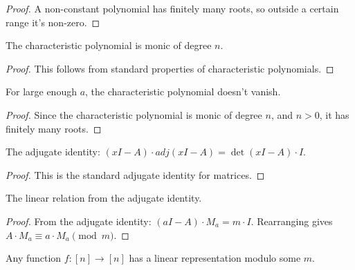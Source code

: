 \begin{proof}
A non-constant polynomial has finitely many roots, so outside a certain range it's non-zero.
\end{proof}

\begin{lemma}
\label{lem:charpoly_monic_degree}
\leanok
The characteristic polynomial is monic of degree $n$.
\end{lemma}

\begin{proof}
This follows from standard properties of characteristic polynomials.
\end{proof}

\begin{lemma}
\label{lem:charpoly_eval_nonzero_large}
For large enough $a$, the characteristic polynomial doesn't vanish.
\end{lemma}

\begin{proof}
Since the characteristic polynomial is monic of degree $n$, and $n > 0$, it has finitely many roots.
\end{proof}

\begin{lemma}
\label{lem:adjugate_identity}
The adjugate identity: $(xI - A) \cdot adj(xI - A) = \det(xI - A) \cdot I$.
\end{lemma}

\begin{proof}
This is the standard adjugate identity for matrices.
\end{proof}

\begin{lemma}
\label{lem:linear_relation_from_adjugate}
The linear relation from the adjugate identity.
\end{lemma}

\begin{proof}
From the adjugate identity: $(aI - A) \cdot M_a = m \cdot I$.
Rearranging gives $A \cdot M_a \equiv a \cdot M_a \pmod{m}$.
\end{proof}

\begin{theorem}
\label{thm:linear_representation}
Any function $f: [n] \to [n]$ has a linear representation modulo some $m$.
\end{theorem}


